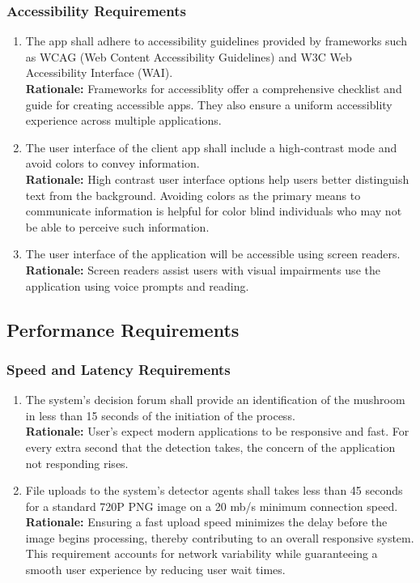 \documentclass[]{article}
\begin{document}
\begin{enumerate}[{\bf BE1.}]
\subsubsection{Accessibility Requirements}
\label{ssub:accessibility_requirements}
\begin{enumerate}[{UH-A}1. ]
	\item The app shall adhere to accessibility guidelines provided by frameworks such as WCAG (Web Content Accessibility Guidelines) and W3C Web Accessibility Interface (WAI).\\
	\textbf{Rationale:} Frameworks for accessiblity offer a comprehensive checklist and guide for creating accessible apps. They also ensure a uniform accessiblity experience across multiple applications.
	\item The user interface of the client app shall include a high-contrast mode and avoid colors to convey information.\\
	\textbf{Rationale:} High contrast user interface options help users better distinguish text from the background. Avoiding colors as the primary means to communicate information is helpful for color blind individuals
	who may not be able to perceive such information.
	\item The user interface of the application will be accessible using screen readers.\\
	\textbf{Rationale:} Screen readers assist users with visual impairments use the application using voice prompts and reading.
\end{enumerate}


\subsection{Performance Requirements}
\label{sub:performance_requirements}

\subsubsection{Speed and Latency Requirements}
\label{ssub:speed_and_latency_requirements}
\begin{enumerate}[{PR-SL}1. ]
	\item The system's decision forum shall provide an identification of the mushroom in less than 15 seconds of the initiation of the process.\\
	\textbf{Rationale:} User's expect modern applications to be responsive and fast. For every extra second that the detection takes, the concern of the application 
	not responding rises.
	\item File uploads to the system's detector agents shall takes less than 45 seconds for a standard 720P PNG image on a 20 mb/s minimum connection speed.\\
	\textbf{Rationale:} Ensuring a fast upload speed minimizes the delay before the image begins processing, thereby contributing to an overall responsive system. This requirement accounts for network variability while guaranteeing a smooth user experience by reducing user wait times.


\end{enumerate}
\end{enumerate}
\end{document}
